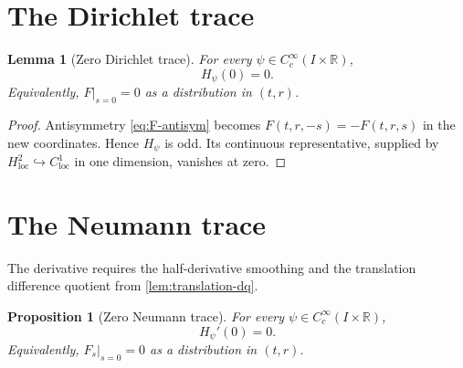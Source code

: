 \documentclass[11pt,oneside]{book}
\newtheorem{proposition}[theorem]{Proposition}
\newtheorem{lemma}[theorem]{Lemma}
\theoremstyle{definition}
\theoremstyle{remark}
\newcommand{\R}{\mathbb R}
\newcommand{\1}{\mathbf 1}
\newcommand{\loc}{\mathrm{loc}}
\begin{document}
\section{The Dirichlet trace}

\begin{lemma}[Zero Dirichlet trace]\label{lem:Dirichlet-trace}
For every $\psi\in C_c^\infty(I\times\R)$,
\[
 H_\psi(0)=0.
\]
Equivalently, $F|_{s=0}=0$ as a distribution in $(t,r)$.
\end{lemma}

\begin{proof}
Antisymmetry \eqref{eq:F-antisym} becomes $F(t,r,-s)=-F(t,r,s)$ in the new
coordinates.  Hence $H_\psi$ is odd.  Its continuous representative, supplied
by $H^2_{\loc}\hookrightarrow C^1_{\loc}$ in one dimension, vanishes at zero.
\end{proof}

\section{The Neumann trace}
The derivative requires the half-derivative smoothing and the translation
difference quotient from \cref{lem:translation-dq}.

\begin{proposition}[Zero Neumann trace]\label{prop:Neumann-trace}
For every $\psi\in C_c^\infty(I\times\R)$,
\[
 H_\psi'(0)=0.
\]
Equivalently, $F_s|_{s=0}=0$ as a distribution in $(t,r)$.
\end{proposition}
\end{document}
